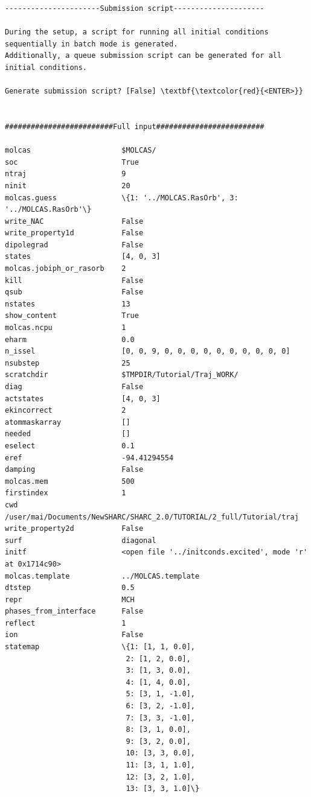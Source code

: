 \documentclass[a4paper,11pt,DIV=15,openany]{scrbook}
\begin{document}
\begin{oframed}
\begin{Verbatim}[commandchars=\\\{\}]
----------------------Submission script---------------------

During the setup, a script for running all initial conditions sequentially in batch mode is generated. 
Additionally, a queue submission script can be generated for all initial conditions.

Generate submission script? [False] \textbf{\textcolor{red}{<ENTER>}}


#########################Full input#########################

molcas                     $MOLCAS/
soc                        True
ntraj                      9
ninit                      20
molcas.guess               \{1: '../MOLCAS.RasOrb', 3: '../MOLCAS.RasOrb'\}
write_NAC                  False
write_property1d           False
dipolegrad                 False
states                     [4, 0, 3]
molcas.jobiph_or_rasorb    2
kill                       False
qsub                       False
nstates                    13
show_content               True
molcas.ncpu                1
eharm                      0.0
n_issel                    [0, 0, 9, 0, 0, 0, 0, 0, 0, 0, 0, 0, 0]
nsubstep                   25
scratchdir                 $TMPDIR/Tutorial/Traj_WORK/
diag                       False
actstates                  [4, 0, 3]
ekincorrect                2
atommaskarray              []
needed                     []
eselect                    0.1
eref                       -94.41294554
damping                    False
molcas.mem                 500
firstindex                 1
cwd                        /user/mai/Documents/NewSHARC/SHARC_2.0/TUTORIAL/2_full/Tutorial/traj
write_property2d           False
surf                       diagonal
initf                      <open file '../initconds.excited', mode 'r' at 0x1714c90>
molcas.template            ../MOLCAS.template
dtstep                     0.5
repr                       MCH
phases_from_interface      False
reflect                    1
ion                        False
statemap                   \{1: [1, 1, 0.0], 
                            2: [1, 2, 0.0], 
                            3: [1, 3, 0.0], 
                            4: [1, 4, 0.0], 
                            5: [3, 1, -1.0], 
                            6: [3, 2, -1.0], 
                            7: [3, 3, -1.0], 
                            8: [3, 1, 0.0], 
                            9: [3, 2, 0.0], 
                            10: [3, 3, 0.0], 
                            11: [3, 1, 1.0], 
                            12: [3, 2, 1.0], 
                            13: [3, 3, 1.0]\}

\end{Verbatim}
\end{oframed}
\end{document}
